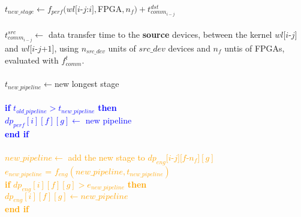 \begin{algorithm}
\begin{algorithmic}[1]
                    \hspace{2.6em} $t_{new\_stage} \leftarrow f_{perf} (wl[$$i$-$j$:$i$$], $FPGA$, n_f) + t^{dst}_{comm_{i-j}} $ \\
                    \hspace{2.6em} \\
                     \hspace{2.6em} $t^{src}_{comm_{i-j}}\leftarrow$ data transfer time to the \textbf{source} devices, between the kernel $wl[i$-$j]$ and $wl[i$-$j$+$1]$, using $n_{src\_dev}$ units of $src\_dev$ devices and $n_f$ untis of FPGAs, evaluated with $f^t_{comm}$. \\
                    \hspace{2.6em} \\
                    \hspace{2.6em} $t_{new\_pipeline} \leftarrow $new longest stage \\
                    \hspace{2.6em} \\
                    \hspace{2.6em} \textcolor{blue}{\textbf{if} {$t_{old\_pipeline} > t_{new\_pipeline}$} \textbf{then} \\
                        \hspace{3.9em} $dp_{perf}[i][f][g] \leftarrow$ new pipeline  \\
                    \hspace{2.6em} \textbf{end if} }\\
                \hspace{2.6em}  \\
                \hspace{2.6em} \textcolor{orange}{$new\_pipeline \leftarrow$ add the new stage to $dp_{eng}[i$-$j][f$-$n_f][g]$ \\
                \hspace{2.6em} $e_{new\_pipeline}$ = $f_{eng}(new\_pipeline, t_{new\_pipeline})$ \\
                \hspace{2.6em} \textbf{if} {$dp_{eng}[i][f][g] > e_{new\_pipeline}$} \textbf{then} \\
                    \hspace{3.9em} $dp_{eng}[i][f][g] \leftarrow  new\_pipeline $\\
                \hspace{2.6em} \textbf{end if}}\\
                

\end{algorithmic}
\end{algorithm}
